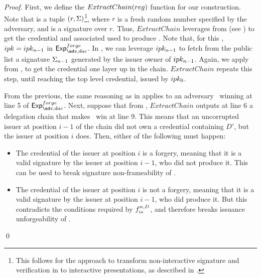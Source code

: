 \begin{proof}
  First, we define the $ExtractChain(reg)$ function for our construction.
  Note that \utrans is a tuple $(r,\Sigma)$\footnote{This follows for the approach
    to transform non-interactive signature and verification in \UAS to
    interactive presentations, as described in .}, where
  $r$ is a fresh random number specified by the adversary,
  and \Sig is a \CUASGen signature over $r$. Thus, $ExtractChain$ leverages
  \ExtractSign from \CUASGen (see ) to get the
  credential and associated \ipk used to produce \Sig. Note that, for this
  \ipk, $ipk = ipk_{n-1}$ in $\Exp^{forge}_{\adv,dac}$. In \CUASDAC, we can
  leverage $ipk_{n-1}$ to fetch from the public list a signature $\Sigma_{n-1}$
  generated by the issuer owner of $ipk_{n-1}$. Again, we apply \ExtractSign
  from \CUASGen, to get the credential one layer up in the chain.
  $ExtractChain$ repeats this step, until reaching the top level credential,
  issued by $ipk_0$.

  From the previous, the same reasoning as in  applies
  to an adversary \adv~winning at line 5 of $\Exp^{forge}_{\adv,dac}$. Next,
  suppose that from \utrans, $ExtractChain$ outputs at line 6 a
  delegation chain that makes \adv~win at line 9. This means that an
  uncorrupted issuer at position $i-1$ of the chain did not own a credential
  containing $D'$, but the issuer at position $i$ does. Then, either of the
  following must happen:

  \begin{itemize}
  \item The credential of the issuer at position $i$ is a forgery, meaning that
    it is a valid signature by the issuer at position $i-1$, who did not produce
    it. This can be used to break signature non-frameability of \CUASGenInt.
  \item The credential of the issuer at position $i$ is not a forgery, meaning
    that it is a valid signature by the issuer at position $i-1$, who did
    produce it. But this contradicts the conditions required by $f_{is}^{n,D}$,
    and therefore breaks issuance unforgeability of \CUASGenInt.
  \end{itemize}
  \qed
\end{proof}

